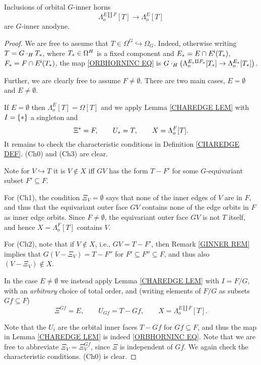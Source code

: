 \documentclass[a4paper,10pt,draft]{article}%
\begin{document}
\begin{proposition}\label{ORB_HORN_PROP}
      Inclusions of orbital $G$-inner horns
\begin{equation}\label{ORBHORNINC EQ}
	\Lambda_o^{E \amalg F}[T] \to \Lambda_o^{E}[T]
\end{equation}
are $G$-inner anodyne.
\end{proposition}


\begin{proof}
We are free to assume that $T \in \Omega^G \hookrightarrow \Omega_G$. Indeed, otherwise writing $T = G \cdot_H T_{\**}$, where $T_{\**} \in \Omega^H$ is a fixed component and 
$E_{\**}=E \cap E^{\mathsf{i}}(T_{\**})$, $F_{\**} = F \cap E^{\mathsf{i}}(T_{\**})$,
the map \eqref{ORBHORNINC EQ} is
$G \cdot_H 
\left( \Lambda_o^{E_{\**} \amalg F_{\**}}[T_{\**}] \to \Lambda_o^{E_{\**}}[T_{\**}]\right)$.

Further, we are clearly free to assume $F \neq \emptyset$.
There are two main cases, 
$E=\emptyset$ and $E\neq \emptyset$.

If $E=\emptyset$ then $\Lambda_o^{E}[T] = \Omega[T]$ and we apply
Lemma \ref{CHAREDGE LEM} with $I = \{\**\}$ a singleton and
\[
	\Xi^{\**} = F, \qquad 
	U_{\**} = T,\qquad
	X=\Lambda_o^{F}[T].
\]
It remains to check the characteristic conditions in Definition \ref{CHAREDGE DEF}.
	(Ch0) and (Ch3) are clear.
	
	Note for $V\hookrightarrow T$ it is $V \not \in X$ iff 
	$GV$ has the form $T-F'$ for some $G$-equivariant subset
	$F' \subseteq F$.

	For (Ch1), the condition $\Xi_{V} = \emptyset$
	says that none of the inner edges of $V$ are in $F$,
	and thus that the equivariant outer face $G V$ contains none of the edge orbits in $F$ as inner edge orbits. Since $F\neq \emptyset$, the equivariant outer face $GV$ is not $T$ itself, 
	and hence $X=\Lambda_o^{F}[T]$ contains $V$.

	For (Ch2), note that if $V \not \in X$, i.e., 
	$GV = T - F'$, then Remark \ref{GINNER REM} implies that
	$G(V-\Xi_V) = T - F''$ for $F'\subseteq F'' \subseteq F$,
	and thus also $(V-\Xi_V) \not \in X$.
	
	In the case $E \neq \emptyset$ we instead apply Lemma \ref{CHAREDGE LEM} with $I = F/G$, with an 
	\textit{arbitrary} choice of total order, and 
	(writing elements of $F/G$ as subsets $Gf \subseteq F$)
\[
	\Xi^{Gf} = E, \qquad 
	U_{G f}= T - Gf, \qquad
	X=\Lambda_o^{E\amalg F}[T].
\]

Note that the $U_i$ are the orbital inner faces $T - Gf$ for $Gf \subseteq F$, and thus the map
in Lemma \ref{CHAREDGE LEM} is indeed \eqref{ORBHORNINC EQ}.
Note that we are free to abbreviate $\Xi_V = \Xi^{Gf}_V$, since
$\Xi$ is independent of $G f$.
We again check the characteristic conditions. (Ch0) is clear.


\end{proof}
\end{document}
